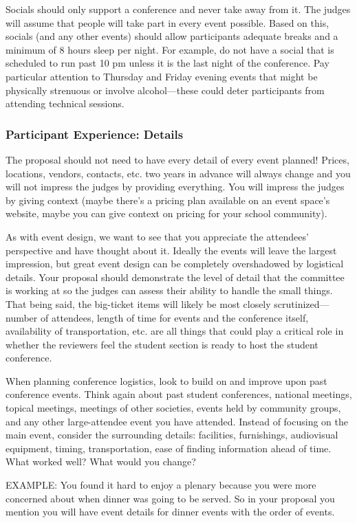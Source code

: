 \documentclass[12pt]{article}
\begin{document}
Socials should only support a conference and never take away from it. The judges will assume that people will take part in every event possible. Based on this, socials (and any other events) should allow participants adequate breaks and a minimum of 8 hours sleep per night. For example, do not have a social that is scheduled to run past 10 pm unless it is the last night of the conference. Pay particular attention to Thursday and Friday evening events that might be physically strenuous or involve alcohol---these could deter participants from attending technical sessions.

\subsubsection{Participant Experience: Details}
The proposal should not need to have every detail of every event planned! Prices, locations, vendors, contacts, etc. two years in advance will always change and you will not impress the judges by providing everything. You will impress the judges by giving context (maybe there's a pricing plan available on an event space's website, maybe you can give context on pricing for your school community).

As with event design, we want to see that you appreciate the attendees’ perspective and have thought about it. Ideally the events will leave the largest impression, but great event design can be completely overshadowed by logistical details. Your proposal should demonstrate the level of detail that the committee is working at so the judges can assess their ability to handle the small things. That being said, the big-ticket items will likely be most closely scrutinized---number of attendees, length of time for events and the conference itself, availability of transportation, etc. are all things that could play a critical role in whether the reviewers feel the student section is ready to host the student conference.

When planning conference logistics, look to build on and improve upon past conference events. Think again about past student conferences, national meetings, topical meetings, meetings of other societies, events held by community groups, and any other large-attendee event you have attended. Instead of focusing on the main event, consider the surrounding details: facilities, furnishings, audiovisual equipment, timing, transportation, ease of finding information ahead of time. What worked well? What would you change?

EXAMPLE: You found it hard to enjoy a plenary because you were more concerned about when dinner was going to be served. So in your proposal you mention you will have event details for dinner events with the order of events.
\end{document}
